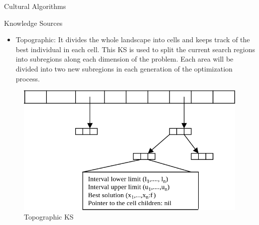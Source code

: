 \documentclass[table]{beamer}
\begin{document}
	\begin{frame}{Cultural Algorithms}
		\begin{block}{Knowledge Sources}
			\begin{itemize}
				\item Topographic: It divides the whole landscape into cells and keeps track of the best individual in each cell. This KS is used to split the current search regions into subregions along each dimension of the problem. Each area will be divided into two new subregions in each generation of the optimization process.
			\end{itemize}
		\end{block}
		\begin{figure}[v]
			\includegraphics[scale=0.26]{topographic}
			\centering
			\caption{Topographic KS}
			\label{ref:topographic}
		\end{figure}
	\end{frame}
	
\end{document}
